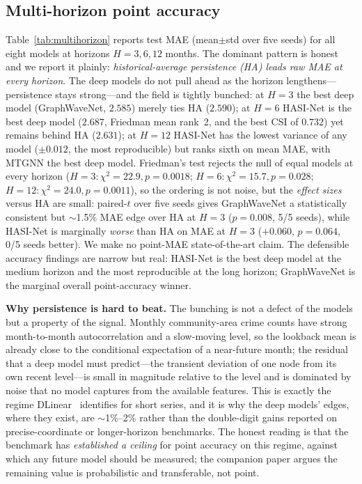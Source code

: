 \documentclass[11pt,conference]{IEEEtran}
\begin{document}
\subsection{Multi-horizon point accuracy}\label{sec:point}
Table~\ref{tab:multihorizon} reports test MAE (mean$\pm$std over five seeds)
for all eight models at horizons $H{=}3,6,12$ months. The dominant pattern is
honest and we report it plainly: \emph{historical-average persistence (HA) leads
raw MAE at every horizon}. The deep models do not pull ahead as the horizon
lengthens---persistence stays strong---and the field is tightly bunched:
at $H{=}3$ the best deep model (GraphWaveNet, $2.585$) merely ties HA
($2.590$); at $H{=}6$ HASI-Net is the best deep model ($2.687$, Friedman mean
rank~2, and the best CSI of $0.732$) yet remains behind HA ($2.631$); at
$H{=}12$ HASI-Net has the lowest variance of any model ($\pm0.012$, the most
reproducible) but ranks sixth on mean MAE, with MTGNN the best deep model.
Friedman's test rejects the null of equal models at every horizon
($H{=}3:\chi^2{=}22.9,p{=}0.0018$; $H{=}6:\chi^2{=}15.7,p{=}0.028$;
$H{=}12:\chi^2{=}24.0,p{=}0.0011$), so the ordering is not noise, but the
\emph{effect sizes} versus HA are small: paired-$t$ over five seeds gives
GraphWaveNet a statistically consistent but $\sim$1.5\% MAE edge over HA at
$H{=}3$ ($p{=}0.008$, 5/5 seeds), while HASI-Net is marginally \emph{worse}
than HA on MAE at $H{=}3$ ($+0.060$, $p{=}0.064$, 0/5 seeds better). We make
no point-MAE state-of-the-art claim. The defensible accuracy findings are
narrow but real: HASI-Net is the best deep model at the medium horizon and the
most reproducible at the long horizon; GraphWaveNet is the marginal overall
point-accuracy winner.

\textbf{Why persistence is hard to beat.} The bunching is not a defect of the
models but a property of the signal. Monthly community-area crime counts have
strong month-to-month autocorrelation and a slow-moving level, so the lookback
mean is already close to the conditional expectation of a near-future month;
the residual that a deep model must predict---the transient deviation of one
node from its own recent level---is small in magnitude relative to the level
and is dominated by noise that no model captures from the available features.
This is exactly the regime DLinear~\cite{zeng2023dlinear} identifies for short
series, and it is why the deep models' edges, where they exist, are
$\sim$1\%--2\% rather than the double-digit gains reported on
precise-coordinate or longer-horizon benchmarks. The honest reading is that
the benchmark has \emph{established a ceiling} for point accuracy on this
regime, against which any future model should be measured; the companion paper
argues the remaining value is probabilistic and transferable, not point.
\end{document}
